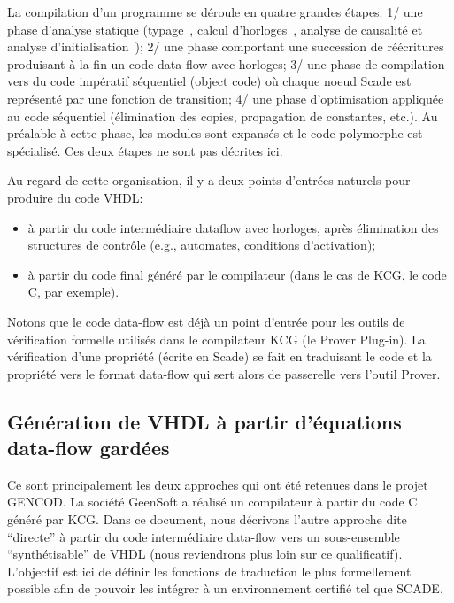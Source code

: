 \documentclass[a4paper]{article}
\begin{document}
La compilation d'un programme se d\'eroule en quatre grandes \'etapes: 1/
une phase d'analyse statique (typage~\cite{lucy:emsoft03}, calcul
d'horloges~\cite{lucy:emsoft04}, analyse de causalit\'e et analyse
d'initialisation~\cite{lucy:sttt04}); 2/ une phase comportant une
succession de r\'e\'ecritures produisant \`a la fin un code data-flow avec
horloges; 3/ une phase de compilation vers du code imp\'eratif
s\'equentiel (object code) o\`u chaque noeud Scade est repr\'esent\'e
par une fonction de transition; 4/ une phase
d'optimisation appliqu\'ee au code s\'equentiel (\'elimination des copies,
propagation de constantes, etc.). Au pr\'ealable \`a cette phase, les modules
sont expans\'es et le code polymorphe est sp\'ecialis\'e. Ces deux \'etapes ne sont pas
d\'ecrites ici.

Au regard de cette organisation, il y a deux points d'entr\'ees naturels pour produire du
code VHDL:
\begin{itemize}
\item
\`a partir du code interm\'ediaire dataflow avec horloges, apr\`es \'elimination des
structures de contr\^ole (e.g., automates, conditions d'activation);
\item
\`a partir du code final g\'en\'er\'e par le compilateur (dans le cas de KCG, le
code C, par exemple).
\end{itemize}
Notons que le code data-flow est d\'ej\`a un point d'entr\'ee pour les outils
de v\'erification formelle utilis\'es dans le compilateur KCG (le Prover Plug-in). La
v\'erification d'une propri\'et\'e (\'ecrite en Scade) se fait en traduisant le code
et la propri\'et\'e vers le format data-flow qui sert alors de passerelle vers l'outil
Prover.

\subsection{G\'en\'eration de VHDL \`a partir d'\'equations data-flow gard\'ees}
Ce sont principalement les deux approches qui ont \'et\'e retenues dans le
projet GENCOD. La soci\'et\'e GeenSoft a r\'ealis\'e un compilateur \`a partir
du code C g\'en\'er\'e par KCG. Dans ce document, nous d\'ecrivons l'autre
approche dite ``directe'' \`a partir du code interm\'ediaire data-flow
vers un sous-ensemble ``synth\'etisable'' de VHDL (nous reviendrons plus loin
sur ce qualificatif). L'objectif est ici de d\'efinir les fonctions de traduction
le plus formellement possible afin de pouvoir les int\'egrer \`a un environnement certifi\'e
tel que SCADE.
\end{document}
